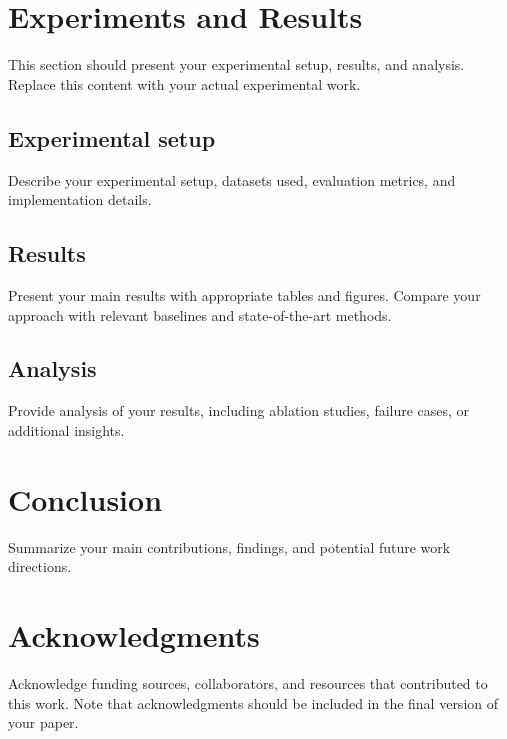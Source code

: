 \section{Experiments and Results}
\label{sec:experiments}

This section should present your experimental setup, results, and analysis.
Replace this content with your actual experimental work.

\subsection{Experimental setup}

Describe your experimental setup, datasets used, evaluation metrics, and implementation details.

\subsection{Results}

Present your main results with appropriate tables and figures.
Compare your approach with relevant baselines and state-of-the-art methods.

\subsection{Analysis}

Provide analysis of your results, including ablation studies, failure cases, or additional insights.

\section{Conclusion}
\label{sec:conclusion}

Summarize your main contributions, findings, and potential future work directions.

\section*{Acknowledgments}

Acknowledge funding sources, collaborators, and resources that contributed to this work.
Note that acknowledgments should be included in the final version of your paper.